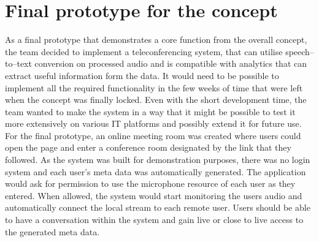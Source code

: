\documentclass[english,12pt,a4paper,dvips]{article}
\begin{document}

\clearpage

\section{Final prototype for the concept}


As a final prototype that demonstrates a core function from the overall concept, the team decided to implement a teleconferencing system, that can utilise speech--to--text conversion on processed audio and is compatible with analytics that can extract useful information form the data. It would need to be possible to implement all the required functionality in the few weeks of time that were left when the concept was finally locked. Even with the short development time, the team wanted to make the system in a way that it might be possible to test it more extensively on various IT platforms and possibly extend it for future use.
For the final prototype, an online meeting room was created where users could open the page and enter a conference room designated by the link that they followed. As the system was built for demonstration purposes, there was no login system and each user's meta data was automatically generated. The application would ask for permission to use the microphone resource of each user as they entered. When allowed, the system would start monitoring the users audio and automatically connect the local stream to each remote user. Users should be able to have a conversation within the system and gain live or close to live access to the generated meta data.
\end{document}
